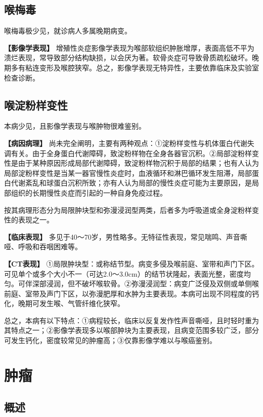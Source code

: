 \subsection{喉梅毒}

喉梅毒极少见，就诊病人多属晚期病变。

\textbf{【影像学表现】}
增殖性炎症影像学表现为喉部软组织肿胀增厚，表面高低不平为溃烂表现，常导致部分结构缺损，以会厌为著。软骨炎症可导致骨质疏松破坏。晚期多有粘连变形及喉腔狭窄。总之，影像学表现无特异性，主要依靠临床及实验室检查诊断。

\subsection{喉淀粉样变性}

本病少见，且影像学表现与喉肿物很难鉴别。

\textbf{【病因病理】}
尚未完全阐明，主要有两种观点：①淀粉样变性与机体蛋白代谢失调有关。由于全身蛋白代谢障碍，致淀粉样物在全身各器官沉积。②局部淀粉样变性是由于某种原因形成局部代谢障碍，致淀粉样物沉积于局部的结果；也有人认为局部淀粉样变性是当某一器官慢性炎症时，血液循环和淋巴循环发生阻滞，局部蛋白代谢紊乱和球蛋白沉积所致；亦有人认为局部的慢性炎症可能为主要原因，是局部组织的长期慢性炎症而引起的一种自身免疫过程。

按其病理形态分为局限肿块型和弥漫浸润型两类，后者多为呼吸道或全身淀粉样变性的表现之一。

\textbf{【临床表现】}
多见于40～70岁，男性略多。无特征性表现，常见喘鸣、声音嘶哑、呼吸和吞咽困难等。

\textbf{【CT表现】}
①局限肿块型：或称结节型。病变多侵及喉前庭、室带和声门下区。可见单个或多个大小不一（可达2.0～3.0cm）的结节状隆起，表面光整，密度均匀。可伴深部浸润，但不破坏喉软骨。②弥漫浸润型：病变广泛侵及双侧或单侧喉前庭、室带及声门下区，以弥漫肥厚和水肿为主要表现。本病可出现不同程度的钙化，晚期可发生喉、气管纤维化狭窄。

总之，本病有以下特点：①病程较长，临床以反复发作性声音嘶哑，且时轻时重为其特点之一；②影像学表现多以喉部肿块为主要表现，且病变范围多较广泛，部分可发生钙化，密度较常见的肿瘤高；③仅靠影像学难以与喉癌鉴别。

\section{肿瘤}

\subsection{概述}

